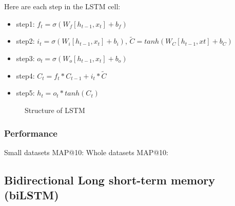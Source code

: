 \documentclass{article}
\begin{document}
Here are each step in the LSTM cell:
\begin{itemize}
\item step1: $f_t = \sigma(W_f[h_{t-1}, x_t] + b_f)$
\item step2: $i_t = \sigma(W_i[h_{t-1}, x_t] + b_i)$,  $\widetilde{C} = tanh(W_C[h_{t-1}, xt] + b_C)$
\item step3: $o_t=\sigma(W_o[h_{t-1}, x_t] + b_o)$
\item step4: $C_t = f_t*C_{t-1} + i_t*\widetilde{C}$
\item step5: $h_t=o_t*tanh(C_t)$
\end{itemize}
\begin{figure}[h]
  \centering
  \caption{Structure of LSTM}
\end{figure}

\subsubsection{Performance}
Small datasets MAP@10: 
Whole datasets MAP@10: 

\subsection{Bidirectional Long short-term memory (biLSTM)}
\end{document}
